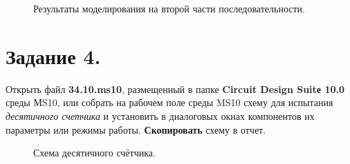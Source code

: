 \documentclass[spec, och, otchet, hidelinks]{SCWorks}
\begin{document}
\begin{figure}[h!]
	\caption{Результаты моделирования на второй части последовательности.}
\end{figure}

\newpage

\section*{Задание 4.}

Открыть файл \textbf{34.10.ms10}, размещенный в папке \textbf{Circuit Design Suitе 10.0} среды МS10, или собрать на рабочем поле среды MS10 схему для 
испытания \textit{десятичного счетчика} и установить в диалоговых окнах компонентов их параметры или режимы работы. \textbf{Скопировать} схему в отчет.

\begin{figure}[h]
	\caption{Схема десятичного счётчика.}
\end{figure}
\end{document}
